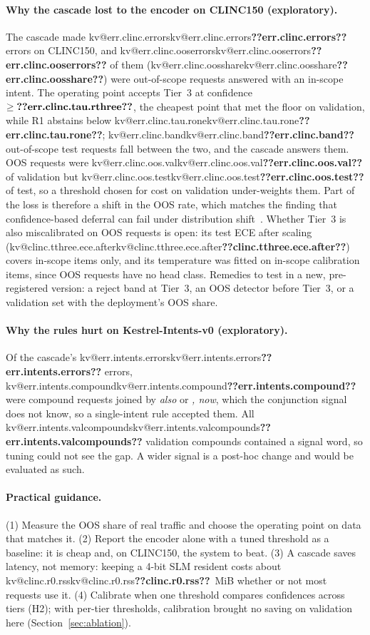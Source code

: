 \documentclass[11pt,a4paper]{article}
\makeatletter
\DeclareRobustCommand{\kv}[1]{\ifcsname kv@#1\endcsname\csname kv@#1\endcsname\else\textbf{??#1??}\fi}
\makeatother
\begin{document}
\paragraph{Why the cascade lost to the encoder on CLINC150 (exploratory).} The cascade made \kv{err.clinc.errors}
errors on CLINC150, and \kv{err.clinc.ooserrors} of them (\kv{err.clinc.oosshare}) were out-of-scope requests answered
with an in-scope intent. The operating point accepts Tier~3 at confidence $\ge\kv{err.clinc.tau.rthree}$, the cheapest
point that met the floor on validation, while R1 abstains below \kv{err.clinc.tau.rone}; \kv{err.clinc.band}
out-of-scope test requests fall between the two, and the cascade answers them. OOS requests were
\kv{err.clinc.oos.val} of validation but \kv{err.clinc.oos.test} of test, so a threshold chosen for cost on validation
under-weights them. Part of the loss is therefore a shift in the OOS rate, which matches the finding that
confidence-based deferral can fail under distribution shift~\citep{jitkrittum2023deferral}. Whether Tier~3 is also
miscalibrated on OOS requests is open: its test ECE after scaling (\kv{clinc.tthree.ece.after}) covers in-scope items
only, and its temperature was fitted on in-scope calibration items, since OOS requests have no head class. Remedies to test in a new, pre-registered version: a reject band at Tier~3, an OOS
detector before Tier~3, or a validation set with the deployment's OOS share.

\paragraph{Why the rules hurt on Kestrel-Intents-v0 (exploratory).} Of the cascade's \kv{err.intents.errors} errors,
\kv{err.intents.compound} were compound requests joined by \emph{also} or \emph{, now}, which the conjunction signal
does not know, so a single-intent rule accepted them. All \kv{err.intents.valcompounds} validation compounds contained
a signal word, so tuning could not see the gap. A wider signal is a post-hoc change and would be evaluated as such.

\paragraph{Practical guidance.} (1) Measure the OOS share of real traffic and choose the operating point on data that
matches it. (2) Report the encoder alone with a tuned threshold as a baseline: it is cheap and, on CLINC150, the system
to beat. (3) A cascade saves latency, not memory: keeping a 4-bit SLM resident costs about \kv{clinc.r0.rss}~MiB
whether or not most requests use it. (4) Calibrate when one threshold compares confidences across tiers (H2); with per-tier
thresholds, calibration brought no saving on validation here (Section~\ref{sec:ablation}).
\end{document}
